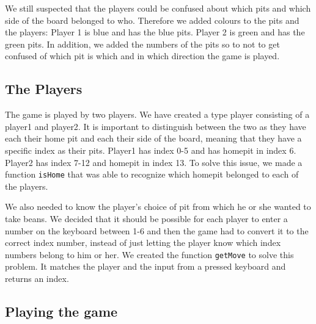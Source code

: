 \documentclass[a4paper]{report}
\begin{document}
We still suspected that the players could be confused about which pits and
which side of the board belonged to who. Therefore we added colours to the
pits and the players: Player 1 is blue and has the blue pits. Player 2 is green
 and has the green pits. In addition, we added the numbers of the pits so to
not to get confused of which pit is which and in which direction the game is played.

\subsection*{The Players}
The game is played by two players. We have created a type player consisting of a player1 and player2. It is important to distinguish between the two as they have each their home pit and each their side of the board, meaning that they have a specific index as their pits. Player1 has index 0-5 and has homepit in index 6. Player2 has index 7-12 and homepit in index 13. To solve this issue, we made a function \texttt{isHome} that was able to recognize which homepit belonged to each of the players.

We also needed to know the player's choice of pit from which he or she wanted to take beans. We decided that it should be possible for each player to enter a number on the keyboard between 1-6 and then the game had to convert it to the correct index number, instead of just letting the player know which index numbers belong to him or her. We created the function \texttt{getMove} to solve this problem. It matches the player and the input from a pressed keyboard and returns an index.

\subsection*{Playing the game}
\end{document}

